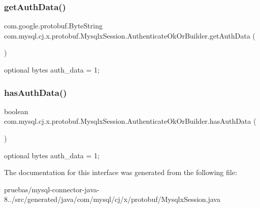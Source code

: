 \subsubsection{\texorpdfstring{get\+Auth\+Data()}{getAuthData()}}
{\footnotesize\ttfamily com.\+google.\+protobuf.\+Byte\+String com.\+mysql.\+cj.\+x.\+protobuf.\+Mysqlx\+Session.\+Authenticate\+Ok\+Or\+Builder.\+get\+Auth\+Data (\begin{DoxyParamCaption}{ }\end{DoxyParamCaption})}

{\ttfamily optional bytes auth\+\_\+data = 1;} \mbox{\label{interfacecom_1_1mysql_1_1cj_1_1x_1_1protobuf_1_1_mysqlx_session_1_1_authenticate_ok_or_builder_a4dbbd5a3164985cb661fa162414e2cb5}} 
\subsubsection{\texorpdfstring{has\+Auth\+Data()}{hasAuthData()}}
{\footnotesize\ttfamily boolean com.\+mysql.\+cj.\+x.\+protobuf.\+Mysqlx\+Session.\+Authenticate\+Ok\+Or\+Builder.\+has\+Auth\+Data (\begin{DoxyParamCaption}{ }\end{DoxyParamCaption})}

{\ttfamily optional bytes auth\+\_\+data = 1;} 

The documentation for this interface was generated from the following file\+:\begin{DoxyCompactItemize}
\item 
pruebas/mysql-\/connector-\/java-\/8../src/generated/java/com/mysql/cj/x/protobuf/Mysqlx\+Session.\+java\end{DoxyCompactItemize}
